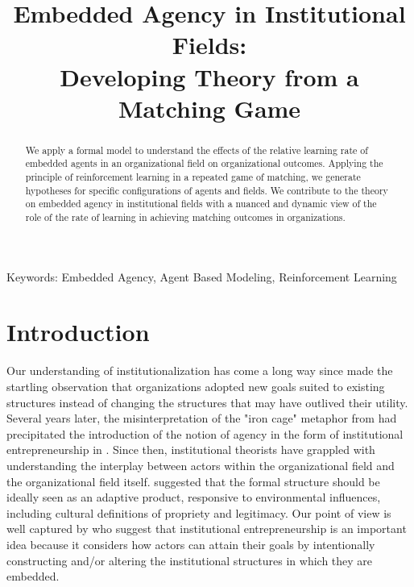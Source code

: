 \documentclass[12pt,letterpaper]{article}
\begin{document}
\title{Embedded Agency in Institutional Fields:\\  Developing Theory from a Matching Game}

\maketitle

\begin{abstract}
We apply a formal model to understand the effects of the relative learning rate of embedded agents in an organizational field on organizational outcomes. Applying the principle of reinforcement learning in a repeated game of matching, we generate hypotheses for specific configurations of agents and fields. We contribute to the theory on embedded agency in institutional fields with a nuanced and dynamic view of the role of the rate of learning in achieving matching outcomes in organizations.
\end{abstract}


{Keywords:} Embedded Agency, Agent Based Modeling, Reinforcement Learning

\newpage
\pagestyle{fancy}
\fancyhf{}
\section{Introduction}\label{S:Introduction}
Our understanding of  institutionalization has come a long way since \cite{Selznick1957} made the startling observation that organizations adopted new goals suited to existing structures  instead of changing the structures that may have outlived their utility. Several years later, the misinterpretation of the "iron cage" metaphor from  \cite{Dimaggio1983} had precipitated the introduction of the notion of agency in the form of institutional entrepreneurship in \cite{Dimaggio1988}. Since then, institutional theorists have grappled with understanding the interplay between  actors within the organizational field and the organizational field itself.  \cite{Selznick1996} suggested that the formal structure should be ideally seen as an adaptive product, responsive to environmental influences, including cultural definitions of propriety and legitimacy. Our point of view is well captured by \cite{Philips2009} who suggest that institutional entrepreneurship is an important idea because it considers how actors can attain their goals by intentionally constructing and/or altering the institutional structures in which they are embedded. \\\\
\end{document}
